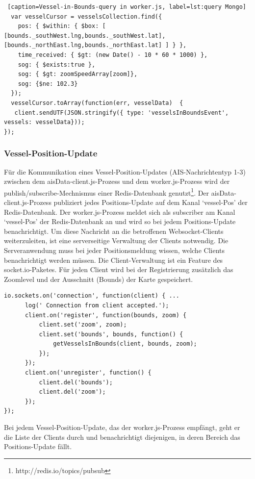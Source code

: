   \begin{lstlisting} [caption=Vessel-in-Bounds-query in worker.js, label=lst:query Mongo]
  var vesselCursor = vesselsCollection.find({
    pos: { $within: { $box: [ [bounds._southWest.lng,bounds._southWest.lat], [bounds._northEast.lng,bounds._northEast.lat] ] } },
    time_received: { $gt: (new Date() - 10 * 60 * 1000) },
    sog: { $exists:true },
    sog: { $gt: zoomSpeedArray[zoom]},
    sog: {$ne: 102.3}
  });
  vesselCursor.toArray(function(err, vesselData)  {
   client.sendUTF(JSON.stringify({ type: 'vesselsInBoundsEvent', vessels: vesselData}));
});
\end{lstlisting}

\subsubsection{Vessel-Position-Update}\label{Vessel-Position-Update}
Für die Kommunikation eines Vessel-Position-Updates (AIS-Nachrichtentyp 1-3) zwischen dem aisData-client.js-Prozess und dem worker.js-Prozess wird der publish/subscribe-Mechnismus einer Redis-Datenbank genutzt\footnote{http://redis.io/topics/pubsub}. Der aisData-client.js-Prozess publiziert jedes Positions-Update auf dem Kanal ‘vessel-Pos’ der Redis-Datenbank. Der worker.js-Prozess meldet sich als subscriber am Kanal ‘vessel-Pos’ der Redis-Datenbank an und wird so bei jedem Positions-Update benachrichtigt.
Um diese Nachricht an die betroffenen Websocket-Clients weiterzuleiten, ist eine serverseitige Verwaltung der Clients notwendig. Die Serveranwendung muss bei jeder Positionsmeldung wissen, welche Clients benachrichtigt werden müssen. Die Client-Verwaltung ist ein Feature des socket.io-Paketes. Für jeden Client wird bei der Registrierung zusätzlich das Zoomlevel und der Ausschnitt (Bounds) der Karte gespeichert.
\begin{lstlisting}[caption= Speichern der übermittelten Client-Daten in worker.js, label=Speichern der übermittelten Client-Daten in worker.js]
io.sockets.on('connection', function(client) { ...
      log(' Connection from client accepted.');
      client.on('register', function(bounds, zoom) {
          client.set('zoom', zoom);
          client.set('bounds', bounds, function() {
              getVesselsInBounds(client, bounds, zoom);
          });
      });
      client.on('unregister', function() {
          client.del('bounds');
          client.del('zoom');
      });
});
  \end{lstlisting}
  Bei jedem Vessel-Position-Update, das der worker.js-Prozess empfängt, geht er die Liste der Clients durch und benachrichtigt diejenigen, in deren Bereich das Positions-Update fällt.
